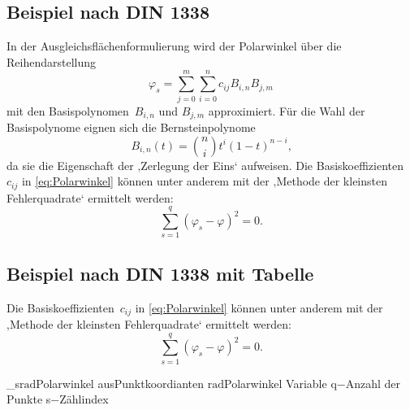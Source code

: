 \subsection{Beispiel nach DIN 1338}
%
In der Ausgleichsflächenformulierung wird der Polarwinkel über die Reihendarstellung
\begin{equation}
	\varphi_s = \sum_{j=0}^{m} \sum_{i=0}^{n} c_{ij} B_{i,n} B_{j,m}
	\label{eq:Polarwinkel}
\end{equation}
mit den Basispolynomen~$B_{i,n}$ und $B_{j,m}$ approximiert. Für die Wahl der Basispolynome eignen sich die Bernsteinpolynome
\begin{equation}
	B_{i,n}(t) = \binom{n}{i} t^i (1 - t)^{n - i}\text{,}
	\label{eq:Bernsteinpolynome}
\end{equation}
da sie die Eigenschaft der ‚Zerlegung der Eins‘ aufweisen. Die Basiskoeffizienten~$c_{ij}$ in \eqref{eq:Polarwinkel} können unter anderem mit der ‚Methode der kleinsten Fehlerquadrate‘ ermittelt werden:
\begin{equation}
	\sum_{s=1}^{q} (\varphi_s - \varphi)^2 = 0\text{.}
	\label{eq:MethodeDerKleinstenFehlerquadrate}
\end{equation}
%
\subsection{Beispiel nach DIN 1338 mit Tabelle}
%
Die Basiskoeffizienten~$c_{ij}$ in \eqref{eq:Polarwinkel} können unter anderem mit der ‚Methode der kleinsten Fehlerquadrate‘ ermittelt werden:
\begin{equation}
	\sum_{s=1}^{q} (\varphi_s - \varphi)^2 = 0\text{.}
	\label{eq:MethodeDerKleinstenFehlerquadrateMitTabelle}
\end{equation}
\begin{Gleichungsparameter}
	\Gleichungparaeintrag
	{\varphi_s}{$\mathrm{rad}$}{Polarwinkel aus\newline Punktkoordianten}
	{\varphi}{$\mathrm{rad}$}{Polarwinkel Variable}
	\Gleichungparaeintrag
	{q}{$\mathrm{-}$}{Anzahl der Punkte}
	{s}{$\mathrm{-}$}{Zählindex}
\end{Gleichungsparameter}
%
%
\newpage
